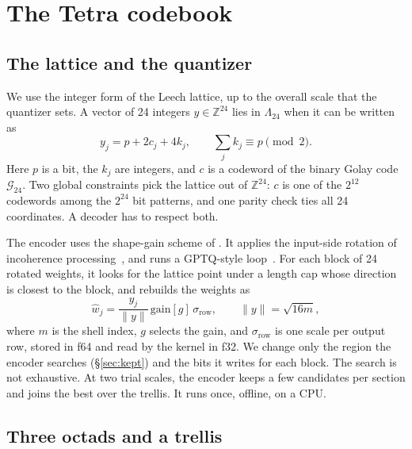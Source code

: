 \section{The Tetra codebook}
\label{sec:tetra}

\subsection{The lattice and the quantizer}

We use the integer form of the Leech lattice, up to the overall scale that the
quantizer sets. A vector of 24 integers $y\in\mathbb{Z}^{24}$ lies in
$\Lambda_{24}$ when it can be written as
\begin{equation}
y_j = p + 2c_j + 4k_j,\qquad \textstyle\sum_j k_j \equiv p \pmod 2 .
\label{eq:leech}
\end{equation}
Here $p$ is a bit, the $k_j$ are integers, and $c$ is a codeword of the binary
Golay code $\mathcal{G}_{24}$. Two global constraints pick the lattice out of
$\mathbb{Z}^{24}$: $c$ is one of the $2^{12}$ codewords among the $2^{24}$ bit
patterns, and one parity check ties all 24 coordinates. A decoder has to
respect both.

The encoder uses the shape-gain scheme of \citet{llvq2026}. It applies the
input-side rotation of incoherence
processing~\citep{quip2023,quipsharp2024,quarot2024}, and runs a GPTQ-style
loop~\citep{gptq2023}. For each block of 24 rotated weights, it looks for the lattice point under a
length cap whose direction is closest to the block, and rebuilds the weights as
\begin{equation}
\hat{w}_j = \frac{y_j}{\lVert y\rVert}\,\mathrm{gain}[g]\,\sigma_{\mathrm{row}},
\qquad \lVert y\rVert=\sqrt{16m},
\label{eq:recon}
\end{equation}
where $m$ is the shell index, $g$ selects the gain, and $\sigma_{\mathrm{row}}$
is one scale per output row, stored in f64 and read by the kernel in f32. We
change only the region the encoder searches (\S\ref{sec:kept}) and the bits it
writes for each block. The \Tetra{} search is not exhaustive. At two trial
scales, the encoder keeps a few candidates per section and joins the best over
the trellis. It runs once, offline, on a CPU.

\subsection{Three octads and a trellis}
\label{sec:octads}

